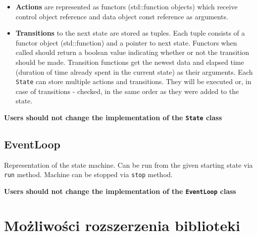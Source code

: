 \documentclass{article}
\begin{document}
\begin{itemize}
\item
  \textbf{Actions} are represented as functors (std::function objects)
  which receive control object reference and data object const reference
  as arguments.
\item
  \textbf{Transitions} to the next state are stored as tuples. Each
  tuple consists of a functor object (std::function) and a pointer to
  next state. Functors when called should return a boolean value
  indicating whether or not the transition should be made. Transition
  functions get the newest data and elapsed time (duration of time
  already spent in the current state) as their arguments. Each
  \texttt{State} can store multiple actions and transitions. They will
  be executed or, in case of transitions - checked, in the same order as
  they were added to the state.
\end{itemize}

\textbf{Users should not change the implementation of the \texttt{State}
class}

\subsection*{EventLoop}\label{eventloop}

Representation of the state machine. Can be run from the given starting
state via \texttt{run} method. Machine can be stopped via \texttt{stop}
method.

\textbf{Users should not change the implementation of the
\texttt{EventLoop} class}

\section{Możliwości rozszerzenia biblioteki}
\end{document}
